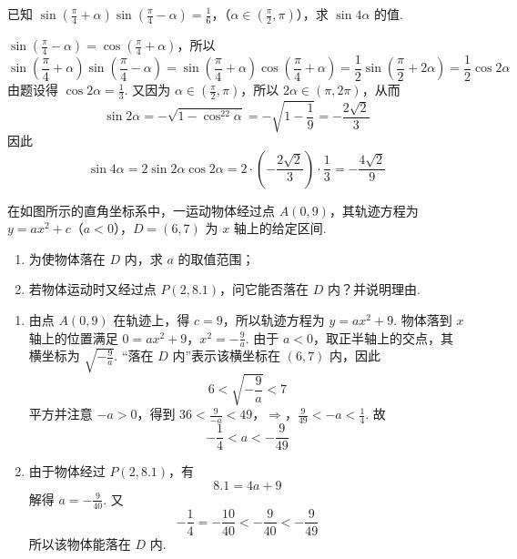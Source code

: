 \begin{problem}
已知 \(\sin\left(\frac{\pi}{4}+\alpha\right)\sin\left(\frac{\pi}{4}-\alpha\right)=\frac{1}{6}\)，（\(\alpha\in\left(\frac{\pi}{2},\pi\right)\)），求 \(\sin 4\alpha\) 的值.
\end{problem}

\begin{solution}
\(\sin\left(\frac{\pi}{4}-\alpha\right)=\cos\left(\frac{\pi}{4}+\alpha\right)\)，所以
\[
\sin\left(\frac{\pi}{4}+\alpha\right)\sin\left(\frac{\pi}{4}-\alpha\right)
=\sin\left(\frac{\pi}{4}+\alpha\right)\cos\left(\frac{\pi}{4}+\alpha\right)
=\frac{1}{2}\sin\left(\frac{\pi}{2}+2\alpha\right)
=\frac{1}{2}\cos2\alpha
\]
由题设得 \(\cos2\alpha=\frac{1}{3}\). 又因为 \(\alpha\in\left(\frac{\pi}{2},\pi\right)\)，所以 \(2\alpha\in(\pi,2\pi)\)，从而
\[
\sin2\alpha=-\sqrt{1-\cos^22\alpha}
=-\sqrt{1-\frac{1}{9}}
=-\frac{2\sqrt{2}}{3}
\]
因此
\[
\sin4\alpha=2\sin2\alpha\cos2\alpha
=2\cdot\left(-\frac{2\sqrt{2}}{3}\right)\cdot\frac{1}{3}
=-\frac{4\sqrt{2}}{9}
\]
\end{solution}

\begin{problem}
在如图所示的直角坐标系中，一运动物体经过点 \(A(0,9)\)，其轨迹方程为 \(y=ax^2+c\)（\(a<0\)），\(D=(6,7)\) 为 \(x\) 轴上的给定区间.

\begin{enumerate}
\item 为使物体落在 \(D\) 内，求 \(a\) 的取值范围；
\item 若物体运动时又经过点 \(P(2,8.1)\)，问它能否落在 \(D\) 内？并说明理由.
\end{enumerate}

\end{problem}

\begin{solution}
\begin{enumerate}
\item 由点 \(A(0,9)\) 在轨迹上，得 \(c=9\)，所以轨迹方程为 \(y=ax^2+9\). 物体落到 \(x\) 轴上的位置满足
\(0=ax^2+9\)，\(x^2=-\frac{9}{a}\).
由于 \(a<0\)，取正半轴上的交点，其横坐标为 \(\sqrt{-\frac{9}{a}}\). “落在 \(D\) 内”表示该横坐标在 \((6,7)\) 内，因此
\[
6<\sqrt{-\frac{9}{a}}<7
\]
平方并注意 \(-a>0\)，得到
\(36<\frac{9}{-a}<49\)，\(\Longrightarrow\)，\(\frac{9}{49}<-a<\frac{1}{4}\).
故
\[
-\frac{1}{4}<a<-\frac{9}{49}
\]

\item 由于物体经过 \(P(2,8.1)\)，有
\[
8.1=4a+9
\]
解得 \(a=-\frac{9}{40}\). 又
\[
-\frac{1}{4}=-\frac{10}{40}<-\frac{9}{40}<-\frac{9}{49}
\]
所以该物体能落在 \(D\) 内.
\end{enumerate}
\end{solution}

